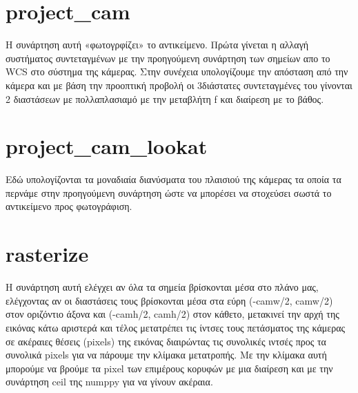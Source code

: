 \documentclass[10pt,a4paper]{article}
\begin{document}
\section*{\textlatin{project\_cam}}

Η συνάρτηση αυτή «φωτογρφίζει» το αντικείμενο. Πρώτα γίνεται η αλλαγή συστήματος
συντεταγμένων με την προηγούμενη συνάρτηση των σημείων απο το \textlatin{WCS} στο σύστημα της κάμερας.
Στην συνέχεια υπολογίζουμε την απόσταση από την κάμερα και με βάση την προοπτική προβολή οι
3διάστατες συντεταγμένες του γίνονται 2 διαστάσεων με πολλαπλασιαμό με την μεταβλήτη f και
διαίρεση με το βάθος.

\section*{\textlatin{project\_cam\_lookat}}

Εδώ υπολογίζονται τα μοναδιαία διανύσματα του πλαισιού της κάμερας τα οποία τα περνάμε
στην προηγούμενη συνάρτηση ώστε να μπορέσει να στοχεύσει σωστά το αντικείμενο προς
φωτογράφιση.

\section*{\textlatin{rasterize}}
Η συνάρτηση αυτή ελέγχει αν όλα τα σημεία βρίσκονται μέσα στο πλάνο μας, ελέγχοντας αν οι
διαστάσεις τους βρίσκονται μέσα στα εύρη (-\textlatin{camw}/2, \textlatin{camw}/2) στον οριζόντιο άξονα και (-\textlatin{camh}/2,
\textlatin{camh}/2) στον κάθετο, μετακινεί την αρχή της εικόνας κάτω αριστερά και τέλος μετατρέπει τις ίντσες τους
πετάσματος της κάμερας σε ακέραιες θέσεις (\textlatin{pixels}) της εικόνας διαιρώντας τις συνολικές ιντσές προς τα
συνολικά pixels για να πάρουμε την κλίμακα μετατροπής. Με την κλίμακα αυτή μπορούμε να βρούμε τα
\textlatin{pixel} των επιμέρους κορυφών με μια διαίρεση και με την συνάρτηση \textlatin{ceil} της \textlatin{numppy} για να γίνουν
ακέραια.
\end{document}
